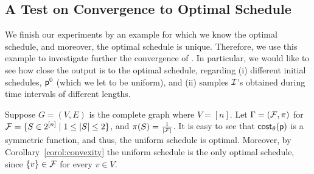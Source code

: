 %
%


\subsection{A Test on Convergence to  Optimal Schedule}
We finish our experiments by an example for which we know the optimal schedule, and moreover, the optimal schedule is unique. Therefore, we use this example to investigate further the convergence of \algonameapx. In particular, we would like to see how close the \algonameapx output is to the optimal schedule, regarding (i) different initial schedules, $\mathsf{p}^0$ (which we let to be uniform), and (ii) samples $\mathcal{I}$'s  obtained during time intervals of different lengths.

Suppose $G=(V,E)$ is the complete graph where $V=[n]$. Let $\Gamma=(\mathcal{F}, \pi)$ for  $\mathcal{F} = \{S \in 2^{[n]} \mid 1 \leq|S| \leq 2\}$, and $\pi(S)=\frac{1}{|\mathcal{F}|}$. It is easy to see that $\mathsf{cost}_\theta(\mathsf{p})$ is a symmetric function, and thus, the uniform schedule is optimal. Moreover, by Corollary~\ref{corol:convexity} the uniform schedule is the only optimal schedule, since $\{v\} \in \mathcal{F}$ for every $v\in V$. 

